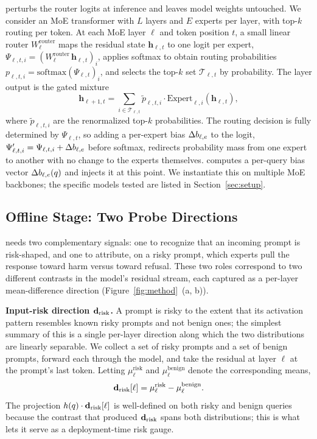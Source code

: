 \name perturbs the router logits at inference and leaves model weights untouched. We consider an MoE transformer with $L$ layers and $E$ experts per layer, with top-$k$ routing per token. At each MoE layer $\ell$ and token position $t$, a small linear router $W_\ell^{\text{router}}$ maps the residual state $\mathbf{h}_{\ell,t}$ to one logit per expert, $\Psi_{\ell,t,i} = (W_\ell^{\text{router}}\, \mathbf{h}_{\ell,t})_i$, applies softmax to obtain routing probabilities $p_{\ell,t,i} = \mathrm{softmax}(\Psi_{\ell,t})_i$, and selects the top-$k$ set $\mathcal{T}_{\ell,t}$ by probability. The layer output is the gated mixture
\begin{equation}
  \mathbf{h}_{\ell+1,t} = \sum_{i \in \mathcal{T}_{\ell,t}} \tilde{p}_{\ell,t,i} \cdot \mathrm{Expert}_{\ell,i}(\mathbf{h}_{\ell,t}),
  \label{eq:moe-layer}
\end{equation}
where $\tilde{p}_{\ell,t,i}$ are the renormalized top-$k$ probabilities. The routing decision is fully determined by $\Psi_{\ell,t}$, so adding a per-expert bias $\Delta b_{\ell,e}$ to the logit, $\Psi'_{\ell,t,i} = \Psi_{\ell,t,i} + \Delta b_{\ell,e}$ before softmax, redirects probability mass from one expert to another with no change to the experts themselves. \name computes a per-query bias vector $\Delta b_{\ell,e}(q)$ and injects it at this point. We instantiate this on multiple MoE backbones; the specific models tested are listed in Section~\ref{sec:setup}.

\subsection{Offline Stage: Two Probe Directions}
\label{sec:directions}

\name needs two complementary signals: one to recognize that an incoming prompt is risk-shaped, and one to attribute, on a risky prompt, which experts pull the response toward harm versus toward refusal. These two roles correspond to two different contrasts in the model's residual stream, each captured as a per-layer mean-difference direction (Figure~\ref{fig:method}~(a, b)).

\noindent\textbf{Input-risk direction $\mathbf{d}_{\text{risk}}$.}
A prompt is risky to the extent that its activation pattern resembles known risky prompts and not benign ones; the simplest summary of this is a single per-layer direction along which the two distributions are linearly separable. We collect a set of risky prompts and a set of benign prompts, forward each through the model, and take the residual at layer $\ell$ at the prompt's last token. Letting $\mu^{\text{risk}}_\ell$ and $\mu^{\text{benign}}_\ell$ denote the corresponding means,
\begin{equation}
  \mathbf{d}_{\text{risk}}[\ell] = \mu^{\text{risk}}_\ell - \mu^{\text{benign}}_\ell.
  \label{eq:drisk}
\end{equation}
The projection $h(q) \cdot \mathbf{d}_{\text{risk}}[\ell]$ is well-defined on both risky and benign queries because the contrast that produced $\mathbf{d}_{\text{risk}}$ spans both distributions; this is what lets it serve as a deployment-time risk gauge.

